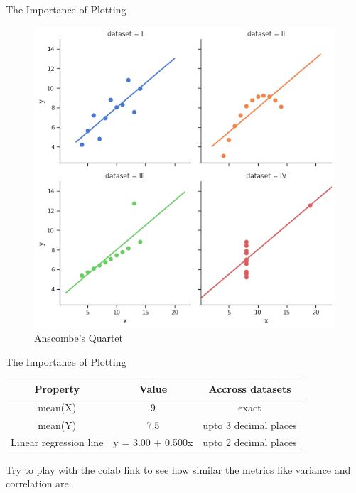 \documentclass{beamer}
\begin{document}
\begin{frame}{The Importance of Plotting}
\begin{figure}[htp]
    \centering
    \includegraphics[width=0.6\linewidth]{accuracy/ans1.png}
    \caption{Anscombe’s Quartet}
\end{figure}
\end{frame}

\begin{frame}{The Importance of Plotting}
\begin{tabular}{|c|c|c|}
\hline 
Property & Value & Accross datasets \\ 
\hline 
mean(X) & 9 & exact \\ 
mean(Y) & 7.5 & upto 3 decimal places \\ 
Linear regression line & 	y = 3.00 + 0.500x & upto 2 decimal places \\ 
\hline 
\end{tabular} 

Try to play with the \href{https://colab.research.google.com/drive/12Rrh7sf_lR-WUd4nYciOAKiil5kqWPAq}{colab link} to see how similar the metrics like variance and correlation are.

\end{frame}
\end{document}

